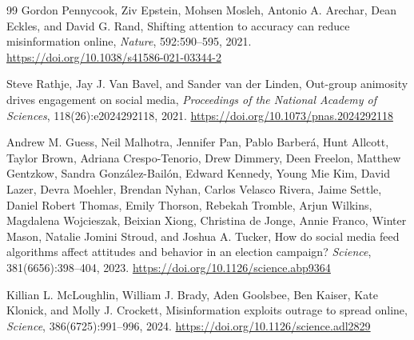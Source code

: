 \documentclass[11pt]{article}
\begin{document}
\begin{thebibliography}{99}
Gordon Pennycook, Ziv Epstein, Mohsen Mosleh, Antonio A. Arechar,
Dean Eckles, and David G. Rand,
\newblock Shifting attention to accuracy can reduce misinformation online,
\newblock \emph{Nature}, 592:590--595, 2021.
\newblock \url{https://doi.org/10.1038/s41586-021-03344-2}

Steve Rathje, Jay J. Van Bavel, and Sander van der Linden,
\newblock Out-group animosity drives engagement on social media,
\newblock \emph{Proceedings of the National Academy of Sciences},
118(26):e2024292118, 2021.
\newblock \url{https://doi.org/10.1073/pnas.2024292118}

Andrew M. Guess, Neil Malhotra, Jennifer Pan, Pablo Barber\'a,
Hunt Allcott, Taylor Brown, Adriana Crespo-Tenorio, Drew Dimmery,
Deen Freelon, Matthew Gentzkow, Sandra Gonz\'alez-Bail\'on,
Edward Kennedy, Young Mie Kim, David Lazer, Devra Moehler,
Brendan Nyhan, Carlos Velasco Rivera, Jaime Settle, Daniel Robert Thomas,
Emily Thorson, Rebekah Tromble, Arjun Wilkins, Magdalena Wojcieszak,
Beixian Xiong, Christina de Jonge, Annie Franco, Winter Mason,
Natalie Jomini Stroud, and Joshua A. Tucker,
\newblock How do social media feed algorithms affect attitudes and
behavior in an election campaign?
\newblock \emph{Science}, 381(6656):398--404, 2023.
\newblock \url{https://doi.org/10.1126/science.abp9364}

Killian L. McLoughlin, William J. Brady, Aden Goolsbee,
Ben Kaiser, Kate Klonick, and Molly J. Crockett,
\newblock Misinformation exploits outrage to spread online,
\newblock \emph{Science}, 386(6725):991--996, 2024.
\newblock \url{https://doi.org/10.1126/science.adl2829}

\end{thebibliography}
\end{document}

